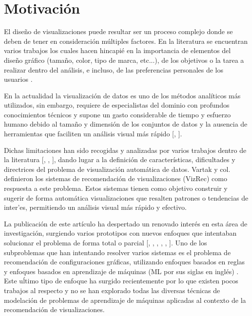 \section*{Motivaci\'on}

El dise\~no de visualizaciones puede resultar ser un proceso complejo 
donde se deben de tener en consideraci\'on m\'ultiples factores. 
En la literatura se encuentran varios trabajos los cuales hacen hincapi\'e en la importancia
de elementos del dise\~no gr\'afico (tama\~no, color, tipo de marca, etc...),
de los objetivos o la tarea a realizar dentro del an\'alisis, e incluso, de las
preferencias personales de los usuarios \cite{zeng2021we}.

En la actualidad la visualizaci\'on de datos es uno de los m\'etodos
anal\'iticos m\'as utilizados, sin embargo, requiere de especialistas
del dominio con profundos conocimientos t\'ecnicos y supone un gasto
considerable de tiempo y esfuerzo humano debido al tama\~no y dimensi\'on
de los conjuntos de datos y la ausencia de herramientas que faciliten un
an\'alisis visual m\'as r\'apido [\cite*{chen2012business}, \cite*{vartak2017towards}].

Dichas limitaciones han sido recogidas y analizadas por varios trabajos dentro de la
literatura [\cite*{zeng2021we}, \cite*{vartak2017towards}, \cite*{godfrey2016interactive}], 
dando lugar a la definici\'on de caracter\'isticas, dificultades y 
directrices del problema de visualizaci\'on autom\'atica de datos.
Vartak y col. \cite{vartak2017towards} definieron los sistemas de recomendaci\'on
de visualizaciones (VizRec) como respuesta a este problema. Estos sistemas tienen como
objetivo construir y sugerir de forma autom\'atica visualizaciones que resalten
patrones o tendencias de inter'es, permitiendo un an\'alisis visual m\'as r\'apido
y efectivo.

La publicaci\'on de este art\'iculo ha despertado un renovado inter\'es en esta \'area de
investigaci\'on, surgiendo varios prototipos con nuevos enfoques que intentaban solucionar
el problema de forma total o parcial 
[\cite*{luo2018deepeye}, \cite*{moritz2018draco}, \cite*{dibia2019data2vis}, \cite*{hu2019vizml}, \cite*{li2021kg4vis}, \cite*{harris2021insight}].
Uno de los subproblemas que han intentando resolver varios sistemas es el problema
de recomendaci\'on de configuraciones gr\'aficas, utilizando enfoques
basados en reglas y enfoques basados en aprendizaje de m\'aquinas (ML por sus siglas en ingl\'es) \cite{zeng2021we}. 
Este u\'ltimo tipo de enfoque ha surgido recientemente por lo que existen pocos trabajos al
respecto y no se han explorado todas las diversas t\'ecnicas de modelaci\'on de problemas
de aprendizaje de m\'aquinas aplicadas al contexto de la recomendaci\'on de visualizaciones.



